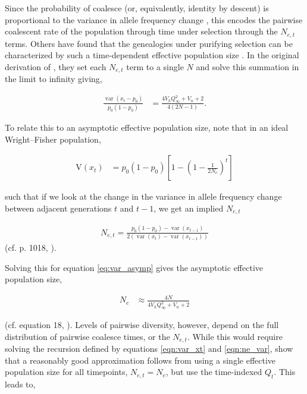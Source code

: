 \documentclass[11pt]{article}
\newcommand{\V}{\text{V}}
\DeclareMathOperator{\var}{var}
\begin{document}
Since the probability of coalesce (or, equivalently, identity by descent) is
proportional to the variance in allele frequency change
\parencite{Barton2000-zg}, this encodes the pairwise coalescent rate of the
population through time under selection through the $N_{e,t}$ terms. Others
have found that the genealogies under purifying selection can be characterized
by such a time-dependent effective population size
\parencite{Nicolaisen2013-gv}. In the original derivation of
\textcite{Santiago1995-hx}, they set each $N_{e,t}$ term to a single $N$ and
solve this summation in the limit to infinity giving,

\begin{align}
  \label{eq:var_asymp}
  \frac{\var(x_t - p_0)}{p_0(1-p_0)} &= \frac{4 V_h Q_\infty^2 +V_n+2}{4 (2 N-1)}.
\end{align}

To relate this to an asymptotic effective population size, note that in an
ideal Wright--Fisher population,

\begin{align}
  \V(x_t) &= p_0(1-p_0) \left[1 - \left(1 - \frac{1}{2N_e}\right)^t \right]
\end{align}

such that if we look at the change in the variance in allele frequency change
between adjacent generations $t$ and $t-1$, we get an implied $N_{e,t}$

\begin{align}
  \label{eqn:ne_var}
  N_{e,t} = \frac{p_0(1-p_0) - \var(x_{t-1})}{2(\var(x_t) - \var(x_{t-1}))}
\end{align}
%
(cf. p. 1018, \cite{Santiago1995-hx}). 

Solving this for equation \eqref{eq:var_asymp} gives the asymptotic effective
population size,

\begin{align}
  N_e &\approx \frac{4N}{4 V_h Q_\infty^2 +V_n+2}
\end{align}

(cf. equation 18, \cite{Santiago1995-hx}). Levels of pairwise diversity,
however, depend on the full distribution of pairwise coalesce times, or the
$N_{e,t}$. While this would require solving the recursion defined by equations
\eqref{eqn:var_xt} and \eqref{eqn:ne_var}, \textcite{Santiago1998-bs} show that
a reasonably good approximation follows from using a single effective
population size for all timepoints, $N_{e,t} = N_e$, but use the time-indexed
$Q_t$. This leads to,
\end{document}
